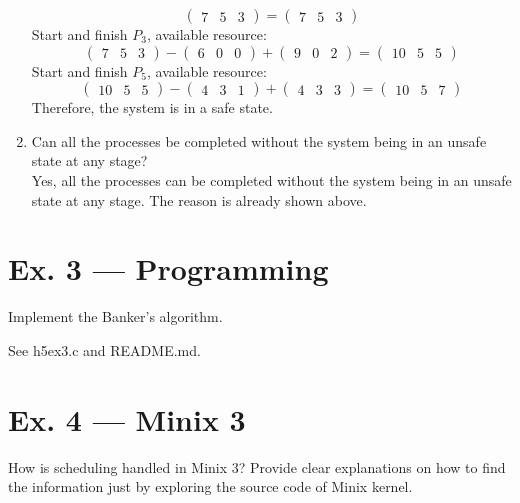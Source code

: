 \documentclass[a4paper]{article}
\begin{document}
\begin{enumerate}
\[    \begin{pmatrix}
        7&5&3
    \end{pmatrix}=
    \begin{pmatrix}
        7&5&3
    \end{pmatrix}
    \]
    Start and finish $P_3$, available resource:
    \[\begin{pmatrix}
        7&5&3
    \end{pmatrix}-
    \begin{pmatrix}
        6&0&0
    \end{pmatrix}+
    \begin{pmatrix}
        9&0&2
    \end{pmatrix}=
    \begin{pmatrix}
        10&5&5
    \end{pmatrix}
    \]
    Start and finish $P_5$, available resource:
    \[\begin{pmatrix}
        10&5&5
    \end{pmatrix}-
    \begin{pmatrix}
        4&3&1
    \end{pmatrix}+
    \begin{pmatrix}
        4&3&3
    \end{pmatrix}=
    \begin{pmatrix}
        10&5&7
    \end{pmatrix}
    \]
    Therefore, the system is in a safe state.
    \item Can all the processes be completed without the system being in an unsafe state at any stage?\\
    Yes, all the processes can be completed without the system being in an unsafe state at any stage. The reason is already shown above.
\end{enumerate}
\section*{Ex. 3 — Programming}
Implement the Banker’s algorithm.

See h5ex3.c and README.md.
\section*{Ex. 4 — Minix 3}
How is scheduling handled in Minix 3? Provide clear explanations on how to find the information just by exploring the source code of Minix kernel.
\end{document}

